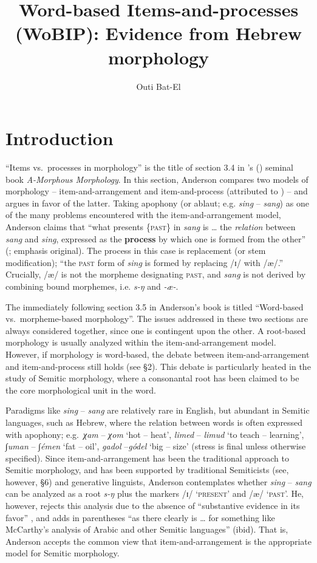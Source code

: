 \documentclass[output=paper,
modfonts
]{LSP/langsci}
\title{Word-based Items-and-processes (WoBIP): Evidence from Hebrew morphology}
\author{Outi Bat-El
	\affiliation{Tel-Aviv University}}
\begin{document}
	\maketitle
	
	
	\section{Introduction}\label{introduction}
	
	``Items vs.\ processes in morphology'' is the title of section 3.4 in
\citeauthor{anderson1992}'s (\citeyear{anderson1992}) seminal book \emph{A-Morphous Morphology}. In this
section, Anderson compares two models of morphology --
item-and-arrangement and item-and-process (attributed to \citealt{Hockett1954})
-- and argues in favor of the latter. Taking apophony (or ablaut; e.g.
\emph{sing} -- \emph{sang}) as one of the many problems encountered with
the item-and-arrangement model, Anderson claims that ``what presents
\{\textsc{past}\} in \emph{sang} is \ldots{} the \emph{relation} between
\emph{sang} and \emph{sing}, expressed as the \textbf{process} by which
one is formed from the other'' (\citealt[62]{anderson1992}; emphasis original).
The process in this case is replacement (or stem modification); ``the
\textsc{past} form of \emph{sing} is formed by replacing /ɪ/ with /æ/.'' Crucially, /æ/ is not the morpheme designating \textsc{past},
and \emph{sang} is not derived by combining bound morphemes, i.e.
\emph{s-ŋ} and \emph{-æ-}.

The immediately following section 3.5 in Anderson's book is titled
``Word-based vs.\ morpheme-based morphology''. The issues addressed in
these two sections are always considered together, since one is
contingent upon the other. A root-based morphology is usually analyzed
within the item-and-arrangement model. However, if morphology is
word-based, the debate between item-and-arrangement and item-and-process
still holds (see §2). This debate is particularly heated in the study of
Semitic morphology, where a consonantal root has been claimed to be the
core morphological unit in the word.

Paradigms like \emph{sing} -- \emph{sang} are relatively rare in
English, but abundant in Semitic languages, such as Hebrew, where the
relation between words is often expressed with apophony; e.g.\ \emph{χam}
-- \emph{χom} `hot -- heat', \emph{limed} -- \emph{limud} `to teach --
learning', \emph{∫uman} -- \emph{∫émen} `fat -- oil', \emph{gadol}
--\emph{gódel} `big -- size' (stress is final unless otherwise
specified). Since item-and-arrangement has been the traditional approach
to Semitic morphology, and has been supported by traditional Semiticists
(see, however, §6) and generative linguists, Anderson contemplates
whether \emph{sing} -- \emph{sang} can be analyzed as a root \emph{s-ŋ}
plus the markers /ɪ/ `\textsc{present}' and /æ/ `\textsc{past}'. He,
however, rejects this analysis due to the absence of ``substantive
evidence in its favor'' \citep[62]{anderson1992}, and adds in parentheses ``as
there clearly is \ldots{} for something like McCarthy's analysis of
Arabic and other Semitic languages'' (ibid). That is, Anderson accepts
the common view that item-and-arrangement is the appropriate model for
Semitic morphology.
\end{document}
